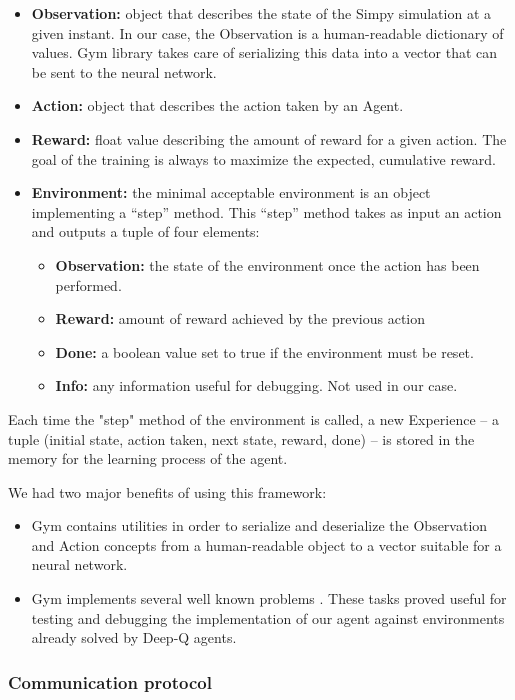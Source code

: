 \documentclass[sn-mathphys]{sn-jnl}
\begin{document}
\begin{itemize}
    \item \textbf{Observation:} object that describes the state of the Simpy simulation at a given instant. In our case, the Observation is a human-readable dictionary of values. Gym library takes care of serializing this data into a vector that can be sent to the neural network.
    \item \textbf{Action:} object that describes the action taken by an Agent.
    \item \textbf{Reward:} float value describing the amount of reward for a given action. The goal of the training is always to maximize the expected, cumulative reward.
    \item \textbf{Environment:} the minimal acceptable environment is an object implementing a “step” method. This “step” method takes as input an action and outputs a tuple of four elements:
    \begin{itemize}
      \item \textbf{Observation:} the state of the environment once the action has been performed.
      \item \textbf{Reward:} amount of reward achieved by the previous action
      \item \textbf{Done:} a boolean value set to true if the environment must be reset.
      \item \textbf{Info:} any information useful for debugging. Not used in our case.
    \end{itemize}
\end{itemize}

Each time the "step" method of the environment is called, a new Experience -- a tuple (initial state, action taken, next state, reward, done) -- is stored in the memory for the learning process of the agent.

We had two major benefits of using this framework:
\begin{itemize}
    \item Gym contains utilities in order to serialize and deserialize the Observation and Action concepts from a human-readable object to a vector suitable for a neural network.
    \item Gym implements several well known problems \cite{openaigymenvs}. These tasks proved useful for testing and debugging the implementation of our agent against environments already solved by Deep-Q agents.
\end{itemize}

\subsubsection{Communication protocol}
\end{document}
